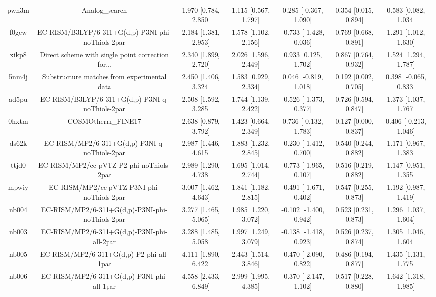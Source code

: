 \documentclass{article}
\begin{document}
\begin{center}
\begin{longtable}{|ccccccc|}
 pwn3m &                                     Analog\_search &  1.970 [0.784, 2.850] &  1.115 [0.567, 1.797] &    0.285 [-0.367, 1.090] &  0.354 [0.015, 0.894] &   0.583 [0.082, 1.034] \\
 f0gew &  EC-RISM/B3LYP/6-311+G(d,p)-P3NI-phi-noThiols-2par &  2.184 [1.381, 2.953] &  1.578 [1.102, 2.156] &   -0.733 [-1.428, 0.036] &  0.769 [0.668, 0.891] &   1.291 [1.012, 1.630] \\
 xikp8 &  Direct scheme with single point correction for... &  2.340 [1.899, 2.720] &  2.026 [1.596, 2.449] &     0.933 [0.125, 1.702] &  0.867 [0.764, 0.932] &   1.524 [1.294, 1.787] \\
 5nm4j &        Substructure matches from experimental data &  2.450 [1.406, 3.324] &  1.583 [0.929, 2.334] &    0.046 [-0.819, 1.018] &  0.192 [0.002, 0.705] &  0.398 [-0.065, 0.833] \\
 ad5pu &    EC-RISM/B3LYP/6-311+G(d,p)-P3NI-q-noThiols-2par &  2.508 [1.592, 3.285] &  1.744 [1.139, 2.422] &   -0.526 [-1.373, 0.377] &  0.726 [0.594, 0.847] &   1.373 [1.037, 1.767] \\
 0hxtm &                                 COSMOtherm\_FINE17 &  2.638 [0.879, 3.792] &  1.423 [0.664, 2.349] &    0.736 [-0.132, 1.783] &  0.127 [0.000, 0.837] &  0.406 [-0.213, 1.046] \\
 ds62k &      EC-RISM/MP2/6-311+G(d,p)-P3NI-q-noThiols-2par &  2.987 [1.446, 4.615] &  1.883 [1.232, 2.845] &   -0.230 [-1.412, 0.700] &  0.540 [0.244, 0.882] &   1.171 [0.967, 1.383] \\
 ttjd0 &           EC-RISM/MP2/cc-pVTZ-P2-phi-noThiols-2par &  2.989 [1.290, 4.738] &  1.695 [1.014, 2.744] &   -0.773 [-1.965, 0.107] &  0.516 [0.219, 0.882] &   1.147 [0.951, 1.355] \\
 mpwiy &         EC-RISM/MP2/cc-pVTZ-P3NI-phi-noThiols-2par &  3.007 [1.462, 4.643] &  1.841 [1.182, 2.815] &   -0.491 [-1.671, 0.402] &  0.547 [0.255, 0.873] &   1.192 [0.987, 1.419] \\
 nb004 &    EC-RISM/MP2/6-311+G(d,p)-P3NI-phi-noThiols-2par &  3.277 [1.465, 5.065] &  1.985 [1.220, 3.072] &   -0.102 [-1.400, 0.942] &  0.523 [0.231, 0.873] &   1.296 [1.037, 1.604] \\
 nb003 &         EC-RISM/MP2/6-311+G(d,p)-P3NI-phi-all-2par &  3.288 [1.485, 5.058] &  1.997 [1.249, 3.079] &   -0.138 [-1.418, 0.923] &  0.526 [0.237, 0.874] &   1.305 [1.046, 1.604] \\
 nb005 &           EC-RISM/MP2/6-311+G(d,p)-P2-phi-all-1par &  4.111 [1.890, 6.422] &  2.443 [1.514, 3.846] &   -0.470 [-2.090, 0.822] &  0.486 [0.194, 0.877] &   1.435 [1.131, 1.775] \\
 nb006 &         EC-RISM/MP2/6-311+G(d,p)-P3NI-phi-all-1par &  4.558 [2.433, 6.849] &  2.999 [1.995, 4.385] &   -0.370 [-2.147, 1.102] &  0.517 [0.228, 0.880] &   1.642 [1.318, 1.985] \\
\end{longtable}
\end{center}
\end{document}
